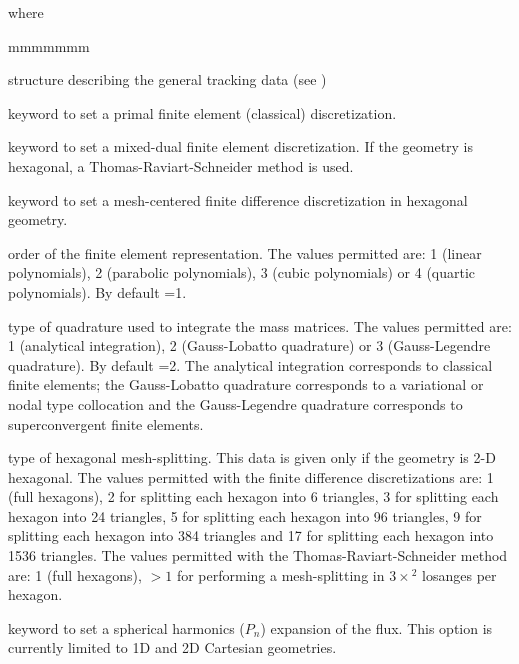 \noindent where

\begin{ListeDeDescription}{mmmmmmm}

\item[\dstr{desctrack}] structure describing the general tracking data (see
)

\item[\moc{PRIM}] keyword to set a primal finite element (classical)
discretization.

\item[\moc{DUAL}] keyword to set a mixed-dual finite element discretization. If the
geometry is hexagonal, a Thomas-Raviart-Schneider method is used.

\item[\moc{MCFD}] keyword to set a mesh-centered finite difference discretization
in hexagonal geometry.

\item[\dusa{ielem}] order of the finite element representation.  The values
permitted are: 1 (linear polynomials), 2 (parabolic polynomials), 3 (cubic
polynomials) or 4 (quartic polynomials). By default =1.

\item[\dusa{icol}] type of quadrature used to integrate the mass matrices. The
values permitted are: 1 (analytical integration), 2  (Gauss-Lobatto quadrature)
or 3 (Gauss-Legendre quadrature). By default =2. The analytical
integration corresponds to classical finite elements; the Gauss-Lobatto
quadrature corresponds to a variational or nodal type collocation and the
Gauss-Legendre quadrature corresponds to superconvergent finite elements.

\item[\dusa{isplh}] type of hexagonal mesh-splitting. This data is given only
if the geometry is 2-D hexagonal. The values permitted with the finite difference
discretizations are: 1 (full hexagons), 2
for splitting each hexagon into 6 triangles, 3 for splitting each hexagon into
24 triangles, 5 for splitting each hexagon into 96 triangles, 9 for splitting
each hexagon into 384 triangles and 17 for splitting each hexagon into 1536
triangles. The values permitted with the Thomas-Raviart-Schneider method are:
1 (full hexagons), $>1$ for performing a mesh-splitting in $3 \times$$^2$
losanges per hexagon.

\item[\moc{PN}] keyword to set a spherical harmonics ($P_n$) expansion of the flux.\cite{nse2005} This option is currently limited to 1D
and 2D Cartesian geometries.


\end{ListeDeDescription}
